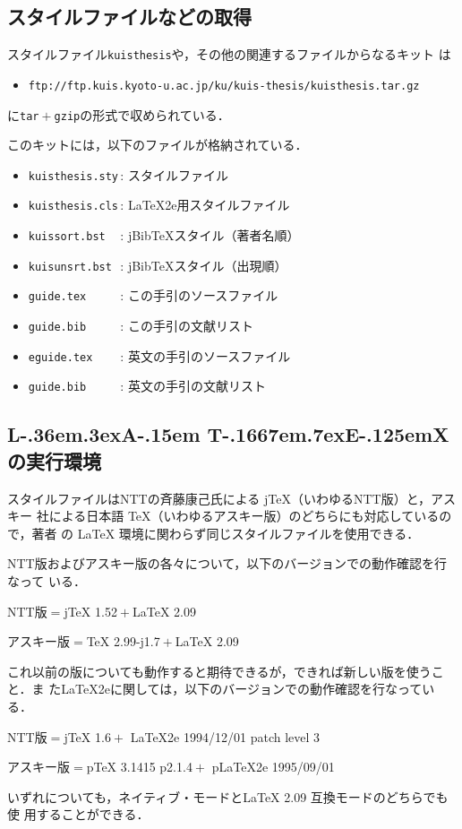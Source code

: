 \documentclass[master]{kuisthesis}		%
\def\LATex{\iLATEX\small}
\def\iLATEX#1{L\kern-.36em\raise.3ex\hbox{#1\bf A}\kern-.15em
    T\kern-.1667em\lower.7ex\hbox{E}\kern-.125emX}
\def\LATEXe{\ifx\LaTeXe\undefined \LaTeX 2e\else\LaTeXe\fi}
\def\|{\verb|}
\begin{document}
\subsection{スタイルファイルなどの取得}\label{appsub-kit}
スタイルファイル\|kuisthesis|や，その他の関連するファイルからなるキット
は
\begin{itemize}\item[]\small%
\|ftp://ftp.kuis.kyoto-u.ac.jp/ku/kuis-thesis/kuisthesis.tar.gz|
\end{itemize}%
に\|tar|${}+{}$\|gzip|の形式で収められている．

このキットには，以下のファイルが格納されている．
\begin{itemize}%
\item
\|kuisthesis.sty|\,:
スタイルファイル
\item
\|kuisthesis.cls|\,:
{\LATEXe}用スタイルファイル
\item
\|kuissort.bst  |\,:
jBib\TeX スタイル（著者名順）
\item
\|kuisunsrt.bst |\,:
jBib\TeX スタイル（出現順）
\item
\|guide.tex     |\,:
この手引のソースファイル
\item
\|guide.bib     |\,:
この手引の文献リスト
\item
\|eguide.tex    |\,:
英文の手引のソースファイル
\item
\|guide.bib     |\,:
英文の手引の文献リスト
\end{itemize}%

\subsection[{\protect\LaTeX}の実行環境]{{\protect\LATex}の実行環境}
\label{appsub-env}
スタイルファイルはNTTの斉藤康己氏による j{\TeX}（いわゆるNTT版）と，アスキー
社による日本語 {\TeX}（いわゆるアスキー版）のどちらにも対応しているので，著者
の {\LaTeX} 環境に関わらず同じスタイルファイルを使用できる．

NTT版およびアスキー版の各々について，以下のバージョンでの動作確認を行なって
いる．
\begin{ITEMIZE}%
\item
NTT版${}={}${j\TeX} 1.52${}+{}${\LaTeX} 2.09
\item 
アスキー版${}={}${\TeX} 2.99-j1.7${}+{}${\LaTeX} 2.09
\end{ITEMIZE}%
これ以前の版についても動作すると期待できるが，できれば新しい版を使うこと．ま
た{\LATEXe}に関しては，以下のバージョンでの動作確認を行なっている．
\begin{ITEMIZE}%
\item
NTT版${}={}${j\TeX} 1.6${}+{}$%
	{\LATEXe} 1994/12/01 patch level 3
\item 
アスキー版${}={}${p\TeX} 3.1415 p2.1.4${}+{}$%
	{p\LATEXe} 1995/09/01
\end{ITEMIZE}%
いずれについても，ネイティブ・モードと{\LaTeX} 2.09 互換モードのどちらでも使
用することができる．
\end{document}
